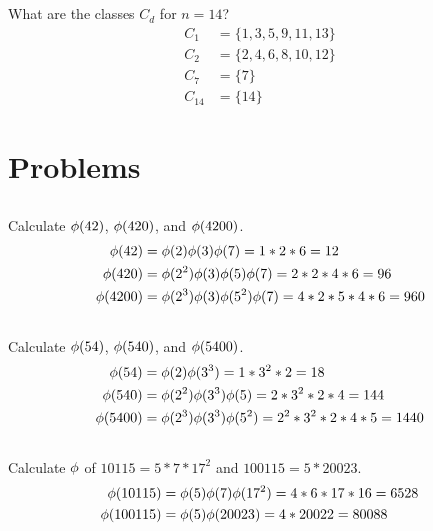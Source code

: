 \documentclass{article}
\begin{document}
\subsection{}
What are the classes $C_d$ for $n = 14$?
\begin{align*}
    C_1 &= \{1, 3, 5, 9, 11, 13\}\\
    C_2 &= \{2, 4, 6, 8, 10, 12\}\\
    C_7 &= \{7\}\\
    C_{14} &= \{14\}
\end{align*}

\section{Problems}

\subsection{}
Calculate $\phi(42)$, $\phi(420)$, and $\phi(4200)$.
\begin{align*}
    \phi(42) &= \phi(2)\phi(3)\phi(7) = 1 * 2 * 6 = 12\\
    \phi(420) &= \phi(2^2)\phi(3)\phi(5)\phi(7) = 2 * 2 * 4 * 6 = 96\\
    \phi(4200) &= \phi(2^3)\phi(3)\phi(5^2)\phi(7) = 4 * 2 * 5 * 4 * 6 = 960
\end{align*}

\subsection{}
Calculate $\phi(54)$, $\phi(540)$, and $\phi(5400)$.
\begin{align*}
    \phi(54) &= \phi(2)\phi(3^3) = 1 * 3^2 * 2 = 18\\
    \phi(540) &= \phi(2^2)\phi(3^3)\phi(5) = 2 * 3^2 * 2 * 4 = 144\\
    \phi(5400) &= \phi(2^3)\phi(3^3)\phi(5^2) = 2^2 * 3^2 * 2 * 4 * 5 = 1440
\end{align*}

\subsection{}
Calculate $\phi$ of $10115 = 5 * 7 * 17^2$ and $100115 = 5 * 20023$.
\begin{align*}
    \phi(10115) &= \phi(5)\phi(7)\phi(17^2) = 4 * 6 * 17 * 16 = 6528\\
    \phi(100115) &= \phi(5)\phi(20023) = 4 * 20022 = 80088
\end{align*}
\end{document}
